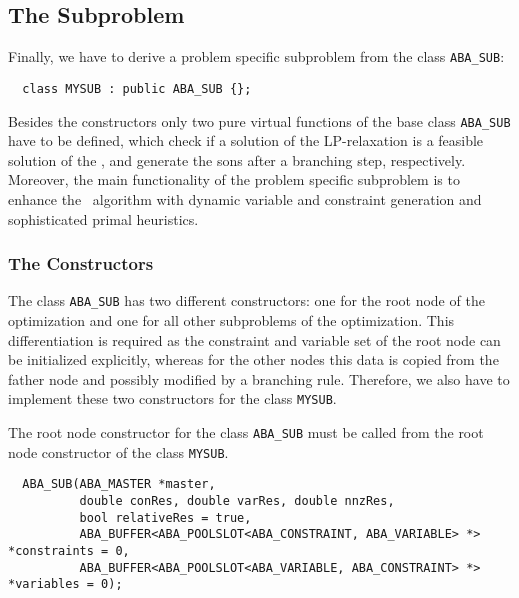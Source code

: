 \subsection{The Subproblem}

Finally, we have to derive a problem specific subproblem from the class
{\tt ABA\_SUB}:
\begin{verbatim}
  class MYSUB : public ABA_SUB {};
\end{verbatim}
Besides the constructors only two pure virtual functions of the base
class {\tt ABA\_SUB} have to be defined, which check if a solution of the 
LP-relaxation is a feasible solution of the \mip, and generate the
sons after a branching step, respectively. Moreover, the main functionality
of the problem specific subproblem is to enhance the \bab\ algorithm
with dynamic variable and constraint generation and sophisticated
primal heuristics.

\subsubsection{The Constructors}

The class {\tt ABA\_SUB} has two different constructors: one for the root node
of the optimization and one for all other subproblems of the optimization.
This differentiation is required as the constraint and variable set
of the root node can be initialized explicitly, whereas for the other nodes
this data is copied from the father node and possibly modified by
a branching rule. Therefore, we also have 
to implement these two constructors for the class {\tt MYSUB}.

The root node constructor for the class {\tt ABA\_SUB} must be called
from the root node constructor of the class {\tt MYSUB}.
\begin{verbatim}
  ABA_SUB(ABA_MASTER *master,
          double conRes, double varRes, double nnzRes,
          bool relativeRes = true,
          ABA_BUFFER<ABA_POOLSLOT<ABA_CONSTRAINT, ABA_VARIABLE> *> *constraints = 0,
          ABA_BUFFER<ABA_POOLSLOT<ABA_VARIABLE, ABA_CONSTRAINT> *> *variables = 0);
\end{verbatim}

